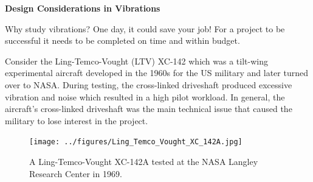 \documentclass[12pt,letter]{article}
\begin{document}
		\begin{vibration_case_study}
			
			\textbf{Design Considerations in Vibrations}

			\noindent Why study vibrations? One day, it could save your job! For a project to be successful it needs to be completed on time and within budget. 
			
			Consider the Ling-Temco-Vought (LTV) XC-142  which was a tilt-wing experimental aircraft developed in the 1960s for the US military and later turned over to NASA. During testing, the cross-linked driveshaft produced excessive vibration and noise which resulted in a high pilot workload. In general, the aircraft's cross-linked driveshaft was the main technical issue that caused the military to lose interest in the project. 
			
			\begin{figure}[H]
				\centering
				\texttt{[image: ../figures/Ling\_Temco\_Vought\_XC\_142A.jpg]}
				\caption{A Ling-Temco-Vought XC-142A tested at the NASA Langley Research Center in 1969. \protect\footnotemark[1]}
			\end{figure}
		\end{vibration_case_study}




	
\end{document}
